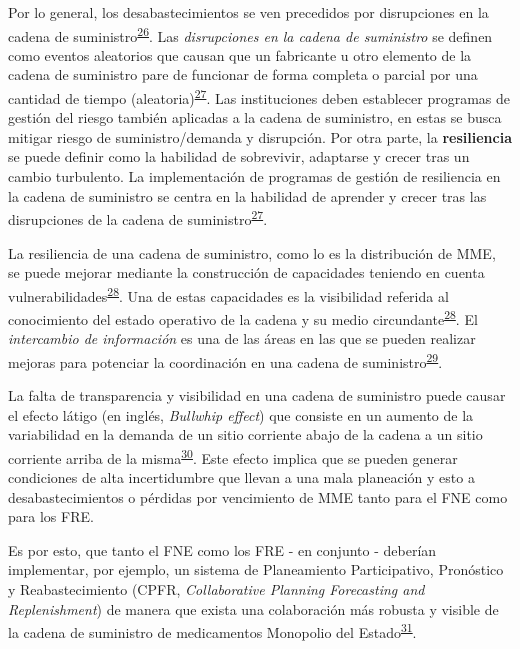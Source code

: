 \documentclass[
]{book}
\begin{document}
Por lo general, los desabastecimientos se ven precedidos por disrupciones en la cadena de suministro\textsuperscript{\protect\hyperlink{ref-FDA2014}{26}}. Las \emph{disrupciones en la cadena de suministro} se definen como eventos aleatorios que causan que un fabricante u otro elemento de la cadena de suministro pare de funcionar de forma completa o parcial por una cantidad de tiempo (aleatoria)\textsuperscript{\protect\hyperlink{ref-Barbosa-Povoa2019}{27}}. Las instituciones deben establecer programas de gestión del riesgo también aplicadas a la cadena de suministro, en estas se busca mitigar riesgo de suministro/demanda y disrupción. Por otra parte, la \textbf{resiliencia} se puede definir como la habilidad de sobrevivir, adaptarse y crecer tras un cambio turbulento. La implementación de programas de gestión de resiliencia en la cadena de suministro se centra en la habilidad de aprender y crecer tras las disrupciones de la cadena de suministro\textsuperscript{\protect\hyperlink{ref-Barbosa-Povoa2019}{27}}.

La resiliencia de una cadena de suministro, como lo es la distribución de MME, se puede mejorar mediante la construcción de capacidades teniendo en cuenta vulnerabilidades\textsuperscript{\protect\hyperlink{ref-Pettit2013}{28}}. Una de estas capacidades es la visibilidad referida al conocimiento del estado operativo de la cadena y su medio circundante\textsuperscript{\protect\hyperlink{ref-Pettit2013}{28}}. El \emph{intercambio de información} es una de las áreas en las que se pueden realizar mejoras para potenciar la coordinación en una cadena de suministro\textsuperscript{\protect\hyperlink{ref-Silver2017}{29}}.

La falta de transparencia y visibilidad en una cadena de suministro puede causar el efecto látigo (en inglés, \emph{Bullwhip effect}) que consiste en un aumento de la variabilidad en la demanda de un sitio corriente abajo de la cadena a un sitio corriente arriba de la misma\textsuperscript{\protect\hyperlink{ref-Cachon2007}{30}}. Este efecto implica que se pueden generar condiciones de alta incertidumbre que llevan a una mala planeación y esto a desabastecimientos o pérdidas por vencimiento de MME tanto para el FNE como para los FRE.

Es por esto, que tanto el FNE como los FRE - en conjunto - deberían implementar, por ejemplo, un sistema de Planeamiento Participativo, Pronóstico y Reabastecimiento (CPFR, \emph{Collaborative Planning Forecasting and Replenishment}) de manera que exista una colaboración más robusta y visible de la cadena de suministro de medicamentos Monopolio del Estado\textsuperscript{\protect\hyperlink{ref-Hollmann2015}{31}}.
\end{document}
